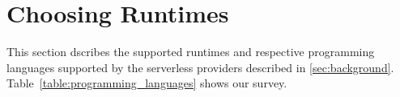 \section{Choosing Runtimes}\label{sec:runtime}
This section dscribes the supported runtimes and respective programming languages supported by the serverless providers described in \ref{sec:background}. 
Table~\ref{table:programming_languages} shows our survey. %

